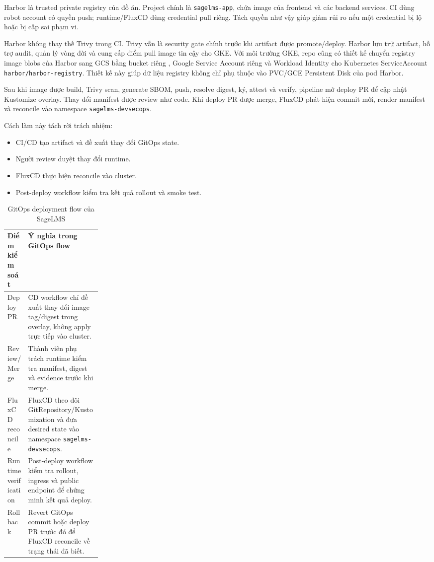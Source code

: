 Harbor là trusted private registry của đồ án. Project chính là \texttt{sagelms-app}, chứa image của frontend và các backend services. CI dùng robot account có quyền push; runtime/FluxCD dùng credential pull riêng. Tách quyền như vậy giúp giảm rủi ro nếu một credential bị lộ hoặc bị cấp sai phạm vi.

Harbor không thay thế Trivy trong CI. Trivy vẫn là security gate chính trước khi artifact được promote/deploy. Harbor lưu trữ artifact, hỗ trợ audit, quản lý vòng đời và cung cấp điểm pull image tin cậy cho GKE. Với môi trường GKE, repo cũng có thiết kế chuyển registry image blobs của Harbor sang GCS bằng bucket riêng , Google Service Account riêng và Workload Identity cho Kubernetes ServiceAccount \texttt{harbor/harbor-registry}. Thiết kế này giúp dữ liệu registry không chỉ phụ thuộc vào PVC/GCE Persistent Disk của pod Harbor.

Sau khi image được build, Trivy scan, generate SBOM, push, resolve digest, ký, attest và verify, pipeline mở deploy PR để cập nhật Kustomize overlay. Thay đổi manifest được review như code. Khi deploy PR được merge, FluxCD phát hiện commit mới, render manifest và reconcile vào namespace \texttt{sagelms-devsecops}.

Cách làm này tách rời trách nhiệm:

\begin{itemize}
  \item CI/CD tạo artifact và đề xuất thay đổi GitOps state.
  \item Người review duyệt thay đổi runtime.
  \item FluxCD thực hiện reconcile vào cluster.
  \item Post-deploy workflow kiểm tra kết quả rollout và smoke test.
\end{itemize}

\begin{table}[H]
\centering
\caption{GitOps deployment flow của SageLMS}
\label{tab:gitops-flow}
\begin{minipage}{0.94\textwidth}
\small
\begin{tabularx}{\linewidth}{|p{0.22\linewidth}|Y|}
\hline
\textbf{Điểm kiểm soát} & \textbf{Ý nghĩa trong GitOps flow} \\
\hline
Deploy PR & CD workflow chỉ đề xuất thay đổi image tag/digest trong overlay, không apply trực tiếp vào cluster. \\
Review/Merge & Thành viên phụ trách runtime kiểm tra manifest, digest và evidence trước khi merge. \\
FluxCD reconcile & FluxCD theo dõi GitRepository/Kustomization và đưa desired state vào namespace \texttt{sagelms-devsecops}. \\
Runtime verification & Post-deploy workflow kiểm tra rollout, ingress và public endpoint để chứng minh kết quả deploy. \\
Rollback & Revert GitOps commit hoặc deploy PR trước đó để FluxCD reconcile về trạng thái đã biết. \\
\hline
\end{tabularx}
\end{minipage}%
\end{table}

